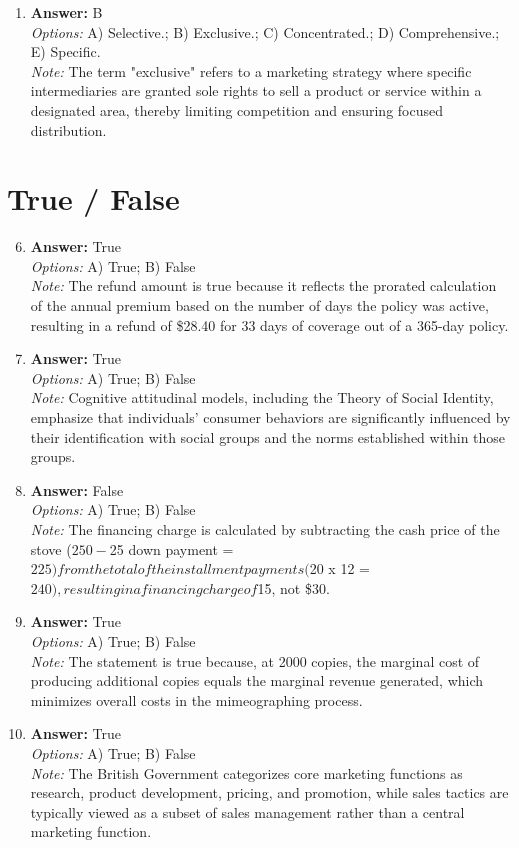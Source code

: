 \documentclass[12pt]{article}
\begin{document}
\begin{enumerate}[label=\arabic*.]
\item \textbf{Answer:} B
\\ \textit{Options:} A) Selective.; B) Exclusive.; C) Concentrated.; D) Comprehensive.; E) Specific.
\\ \textit{Note:} The term "exclusive" refers to a marketing strategy where specific intermediaries are granted sole rights to sell a product or service within a designated area, thereby limiting competition and ensuring focused distribution.
\end{enumerate}

\section*{True / False}
\begin{enumerate}[label=\arabic*.]
\setcounter{enumi}{5}
\item \textbf{Answer:} True
\\ \textit{Options:} A) True; B) False
\\ \textit{Note:} The refund amount is true because it reflects the prorated calculation of the annual premium based on the number of days the policy was active, resulting in a refund of \$28.40 for 33 days of coverage out of a 365-day policy.
\item \textbf{Answer:} True
\\ \textit{Options:} A) True; B) False
\\ \textit{Note:} Cognitive attitudinal models, including the Theory of Social Identity, emphasize that individuals' consumer behaviors are significantly influenced by their identification with social groups and the norms established within those groups.
\item \textbf{Answer:} False
\\ \textit{Options:} A) True; B) False
\\ \textit{Note:} The financing charge is calculated by subtracting the cash price of the stove ($250 - $25 down payment = $225) from the total of the installment payments ($20 x 12 = $240), resulting in a financing charge of $15, not \$30.
\item \textbf{Answer:} True
\\ \textit{Options:} A) True; B) False
\\ \textit{Note:} The statement is true because, at 2000 copies, the marginal cost of producing additional copies equals the marginal revenue generated, which minimizes overall costs in the mimeographing process.
\item \textbf{Answer:} True
\\ \textit{Options:} A) True; B) False
\\ \textit{Note:} The British Government categorizes core marketing functions as research, product development, pricing, and promotion, while sales tactics are typically viewed as a subset of sales management rather than a central marketing function.
\end{enumerate}
\end{document}
